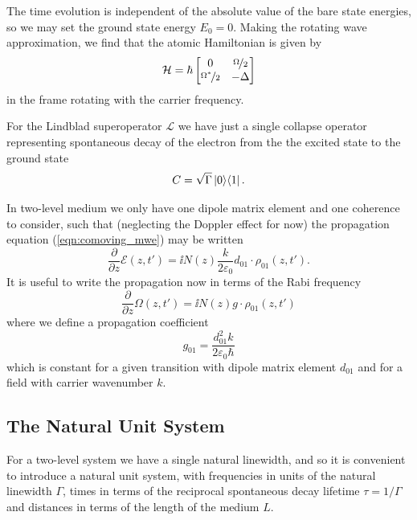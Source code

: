     The time evolution is independent of the absolute value of the bare state
    energies, so we may set the ground state energy $E_0 = 0$. Making the
    rotating wave approximation, we find that the atomic Hamiltonian is given by
    \begin{equation}
      \mathcal{H} = \hbar
      \begin{bmatrix}
        0 & \nicefrac{\Omega}{2} \\
        \nicefrac{\Omega^*}{2} & -\Delta
      \end{bmatrix}
    \end{equation}
    in the frame rotating with the carrier frequency.\cite{allen1975optical}

    For the Lindblad superoperator $\mathcal{L}$ we have just a single collapse
    operator representing spontaneous decay of the electron from the the excited
    state to the ground state
    \begin{equation}
      C = \sqrt{\Gamma}\Ket{0}\!\Bra{1}.
    \end{equation}

    In two-level medium we only have one dipole matrix element and one coherence
    to consider, such that (neglecting the Doppler effect for now) the
    propagation equation (\ref{eqn:comoving_mwe}) may be written
    \begin{equation}
      \frac{\partial}{\partial z}\mathcal{E}(z,t') = 
          \ii N(z) \frac{k}{2 \varepsilon_0} d_{01} \cdot \rho_{01}(z,t').
      \label{eqn:twolevel_field_eqn}
    \end{equation}
    It is useful to write the propagation now in terms of the Rabi frequency
    \begin{equation}
      \frac{\partial}{\partial z}\Omega(z,t') = \ii N(z) g \cdot \rho_{01}(z,t')
    \end{equation}
    where we define a propagation coefficient
    \begin{equation}
      g_{01} = \frac{d_{01}^2 k}{2 \varepsilon_0 \hbar}
    \end{equation}
    which is constant for a given transition with dipole matrix element $d_{01}$
    and for a field with carrier wavenumber $k$.

  \subsection{The Natural Unit System}

    For a two-level system we have a single natural linewidth, and so it is
    convenient to introduce a natural unit system, with frequencies in units of
    the natural linewidth $\Gamma$, times in terms of the reciprocal spontaneous
    decay lifetime $\tau = 1/\Gamma$ and distances in terms of the length of the
    medium $L$.

